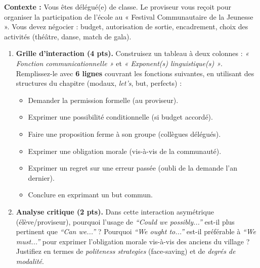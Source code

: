 \documentclass[11pt]{article}
\begin{document}
\begin{exercice}
\textbf{Contexte :} Vous êtes délégué(e) de classe. Le proviseur vous reçoit pour organiser la participation de l'école au « Festival Communautaire de la Jeunesse ». Vous devez négocier : budget, autorisation de sortie, encadrement, choix des activités (théâtre, danse, match de gala).

\begin{enumerate}
    \item \textbf{Grille d'interaction (4 pts).} Construisez un tableau à deux colonnes : \textit{« Fonction communicationnelle »} et \textit{« Exponent(s) linguistique(s) »}. Remplissez-le avec \textbf{6 lignes} couvrant les fonctions suivantes, en utilisant des structures du chapitre (modaux, \textit{let's}, but, perfects) :
    \begin{itemize}
        \item Demander la permission formelle (au proviseur).
        \item Exprimer une possibilité conditionnelle (si budget accordé).
        \item Faire une proposition ferme à son groupe (collègues délégués).
        \item Exprimer une obligation morale (vis-à-vis de la communauté).
        \item Exprimer un regret sur une erreur passée (oubli de la demande l'an dernier).
        \item Conclure en exprimant un but commun.
    \end{itemize}
    \item \textbf{Analyse critique (2 pts).} Dans cette interaction asymétrique (élève/proviseur), pourquoi l'usage de \textit{``Could we possibly...''} est-il plus pertinent que \textit{``Can we...''} ? Pourquoi \textit{``We ought to...''} est-il préférable à \textit{``We must...''} pour exprimer l'obligation morale vis-à-vis des anciens du village ? Justifiez en termes de \textit{politeness strategies} (face-saving) et de \textit{degrés de modalité}.
\end{enumerate}
\end{exercice}
\end{document}
